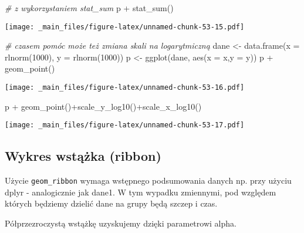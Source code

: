 \documentclass[
]{book}
\newenvironment{Shaded}{\begin{snugshade}}{\end{snugshade}}
\newcommand{\AttributeTok}[1]{\textcolor[rgb]{0.77,0.63,0.00}{#1}}
\newcommand{\CommentTok}[1]{\textcolor[rgb]{0.56,0.35,0.01}{\textit{#1}}}
\newcommand{\DecValTok}[1]{\textcolor[rgb]{0.00,0.00,0.81}{#1}}
\newcommand{\FunctionTok}[1]{\textcolor[rgb]{0.00,0.00,0.00}{#1}}
\newcommand{\NormalTok}[1]{#1}
\newcommand{\OtherTok}[1]{\textcolor[rgb]{0.56,0.35,0.01}{#1}}
\newcommand{\SpecialCharTok}[1]{\textcolor[rgb]{0.00,0.00,0.00}{#1}}
\begin{document}
\begin{Shaded}
\begin{Highlighting}[]
\CommentTok{\# z wykorzystaniem stat\_sum}
\NormalTok{p }\SpecialCharTok{+} \FunctionTok{stat\_sum}\NormalTok{()}
\end{Highlighting}
\end{Shaded}

\texttt{[image: \_main\_files/figure-latex/unnamed-chunk-53-15.pdf]}

\begin{Shaded}
\begin{Highlighting}[]
\CommentTok{\# czasem pomóc może też zmiana skali na logarytmiczną}
\NormalTok{dane }\OtherTok{\textless{}{-}} \FunctionTok{data.frame}\NormalTok{(}\AttributeTok{x =} \FunctionTok{rlnorm}\NormalTok{(}\DecValTok{1000}\NormalTok{), }\AttributeTok{y =} \FunctionTok{rlnorm}\NormalTok{(}\DecValTok{1000}\NormalTok{))}
\NormalTok{p }\OtherTok{\textless{}{-}} \FunctionTok{ggplot}\NormalTok{(dane, }\FunctionTok{aes}\NormalTok{(}\AttributeTok{x =}\NormalTok{ x,}\AttributeTok{y =}\NormalTok{ y))}
\NormalTok{p }\SpecialCharTok{+} \FunctionTok{geom\_point}\NormalTok{()}
\end{Highlighting}
\end{Shaded}

\texttt{[image: \_main\_files/figure-latex/unnamed-chunk-53-16.pdf]}

\begin{Shaded}
\begin{Highlighting}[]
\NormalTok{p }\SpecialCharTok{+} \FunctionTok{geom\_point}\NormalTok{()}\SpecialCharTok{+}\FunctionTok{scale\_y\_log10}\NormalTok{()}\SpecialCharTok{+}\FunctionTok{scale\_x\_log10}\NormalTok{()}
\end{Highlighting}
\end{Shaded}

\texttt{[image: \_main\_files/figure-latex/unnamed-chunk-53-17.pdf]}

\hypertarget{wykres-wstux105ux17cka-ribbon}{%
\subsection{Wykres wstążka (ribbon)}\label{wykres-wstux105ux17cka-ribbon}}

Użycie \texttt{geom\_ribbon} wymaga wstępnego podsumowania danych np. przy użyciu dplyr - analogicznie jak dane1. W tym wypadku zmiennymi, pod względem których będziemy dzielić dane na grupy będą szczep i czas.

Półprzezroczystą wstążkę uzyskujemy dzięki parametrowi alpha.
\end{document}
